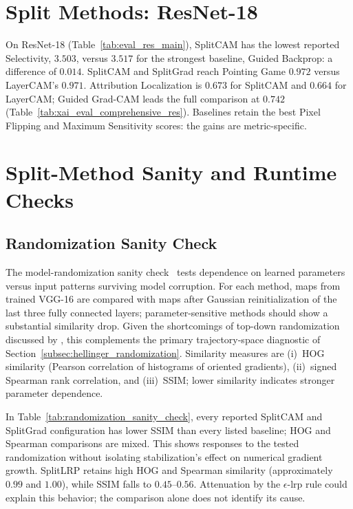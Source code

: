 \section{Split Methods: ResNet-18}\label{sec:results_resnet}

On ResNet-18 (Table~\ref{tab:eval_res_main}), SplitCAM has the lowest reported Selectivity, $3.503$, versus $3.517$ for the strongest baseline, Guided Backprop: a difference of $0.014$. SplitCAM and SplitGrad reach Pointing Game $0.972$ versus LayerCAM's $0.971$. Attribution Localization is $0.673$ for SplitCAM and $0.664$ for LayerCAM; Guided Grad-CAM leads the full comparison at $0.742$ (Table~\ref{tab:xai_eval_comprehensive_res}). Baselines retain the best Pixel Flipping and Maximum Sensitivity scores: the gains are metric-specific.

\section{Split-Method Sanity and Runtime Checks}

\subsection{Randomization Sanity Check}\label{app:p1_sanity}

The model-randomization sanity check~\parencite{Adebayo2018sanity} tests dependence on learned parameters versus input patterns surviving model corruption. For each method, maps from trained VGG-16 are compared with maps after Gaussian reinitialization of the last three fully connected layers; parameter-sensitive methods should show a substantial similarity drop. Given the shortcomings of top-down randomization discussed by \textcite{Binder2022shortcomings}, this complements the primary trajectory-space diagnostic of Section~\ref{subsec:hellinger_randomization}. Similarity measures are (i)~HOG similarity (Pearson correlation of histograms of oriented gradients), (ii)~signed Spearman rank correlation, and (iii)~SSIM; lower similarity indicates stronger parameter dependence.



In Table~\ref{tab:randomization_sanity_check}, every reported SplitCAM and SplitGrad configuration has lower SSIM than every listed baseline; HOG and Spearman comparisons are mixed. This shows responses to the tested randomization without isolating stabilization's effect on numerical gradient growth. SplitLRP retains high HOG and Spearman similarity (approximately $0.99$ and $1.00$), while SSIM falls to $0.45$--$0.56$. Attenuation by the $\epsilon$-\ac{lrp} rule could explain this behavior; the comparison alone does not identify its cause.

